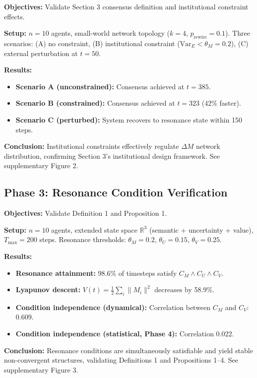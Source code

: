 \documentclass[11pt,a4paper]{article}
\theoremstyle{definition}
\begin{document}
\textbf{Objectives:} Validate Section 3 consensus definition and institutional constraint effects.

\textbf{Setup:} $n = 10$ agents, small-world network topology ($k = 4$, $p_{\text{rewire}} = 0.1$). Three scenarios: (A) no constraint, (B) institutional constraint ($\text{Var}_E < \theta_M = 0.2$), (C) external perturbation at $t = 50$.

\textbf{Results:}
\begin{itemize}
\item \textbf{Scenario A (unconstrained):} Consensus achieved at $t = 385$.
\item \textbf{Scenario B (constrained):} Consensus achieved at $t = 323$ (42\% faster).
\item \textbf{Scenario C (perturbed):} System recovers to resonance state within 150 steps.
\end{itemize}

\textbf{Conclusion:} Institutional constraints effectively regulate $\Delta M$ network distribution, confirming Section 3's institutional design framework. See supplementary Figure 2.

\subsection{Phase 3: Resonance Condition Verification}

\textbf{Objectives:} Validate Definition 1 and Proposition 1.

\textbf{Setup:} $n = 10$ agents, extended state space $\mathbb{R}^3$ (semantic + uncertainty + value), $T_{\max} = 200$ steps. Resonance thresholds: $\theta_M = 0.2$, $\theta_U = 0.15$, $\theta_V = 0.25$.

\textbf{Results:}
\begin{itemize}
\item \textbf{Resonance attainment:} 98.6\% of timesteps satisfy $C_M \land C_U \land C_V$.
\item \textbf{Lyapunov descent:} $V(t) = \frac{1}{2}\sum_i \|M_i\|^2$ decreases by 58.9\%.
\item \textbf{Condition independence (dynamical):} Correlation between $C_M$ and $C_V$: 0.609.
\item \textbf{Condition independence (statistical, Phase 4):} Correlation 0.022.
\end{itemize}

\textbf{Conclusion:} Resonance conditions are simultaneously satisfiable and yield stable non-convergent structures, validating Definitions 1 and Propositions 1--4. See supplementary Figure 3.
\end{document}
